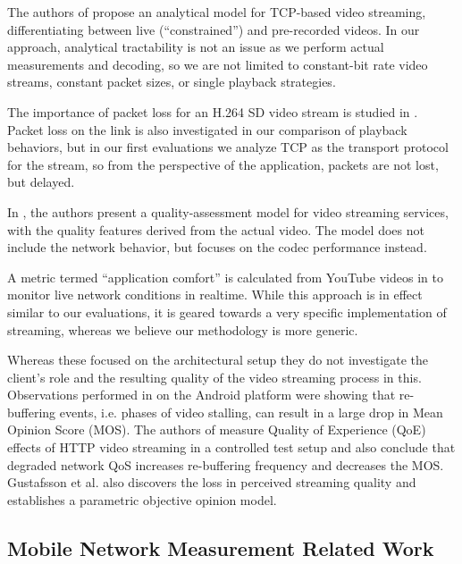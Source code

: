 The authors of \cite{wang2003model} propose an analytical model for TCP-based video streaming, differentiating between live (``constrained'') and pre-recorded videos. In our approach, analytical tractability is not an issue as we perform actual measurements and decoding, so we are not limited to constant-bit rate video streams, constant packet sizes, or single playback strategies.

The importance of packet loss for an H.264 SD video stream is studied in \cite{pv2010loss}. Packet loss on the link is also investigated in our comparison of playback behaviors, but in our first evaluations we analyze TCP as the transport protocol for the stream, so from the perspective of the application, packets are not lost, but delayed.


In \cite{pv2010qoe}, the authors present a quality-assessment model for video streaming services, with the quality features derived from the actual video. The model does not include the network behavior, but focuses on the codec performance instead. 

A metric termed ``application comfort'' is calculated from YouTube videos in \cite{staehle2010yomo} to monitor live network conditions in realtime. While this approach is in effect similar to our evaluations, it is geared towards a very specific implementation of streaming, whereas we believe our methodology is more generic.

Whereas these focused on the architectural setup they do not investigate the client's role and the resulting quality of the video streaming process in this. 
Observations performed in \cite{ketyko2010qoe} on the Android platform were showing that re-buffering events, i.e. phases of video stalling, can result in a large drop in Mean Opinion Score (MOS). The authors of \cite{mokmeasuring} measure Quality of Experience (QoE) effects of HTTP video streaming in a controlled test setup and also conclude that degraded network QoS increases re-buffering frequency and decreases the MOS. Gustafsson et al. \cite{gustafsson2008measmmmquality} also discovers the loss in perceived streaming quality and establishes a parametric objective opinion model.


\subsection{Mobile Network Measurement Related Work}

